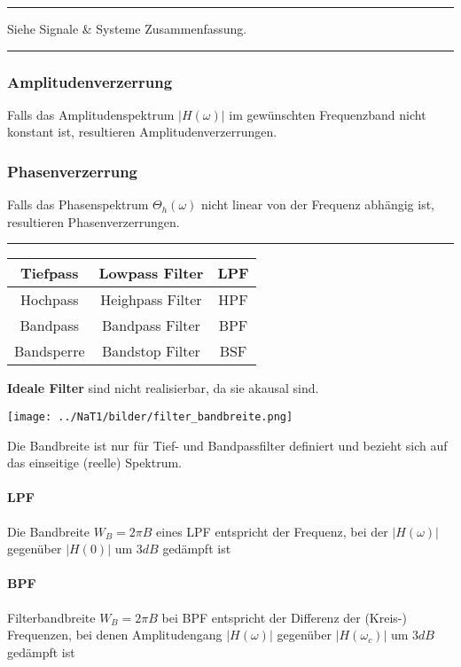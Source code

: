 \hrule
{}
Siehe Signale \& Systeme Zusammenfassung.\\

\hrule
{}
\subsubsection{Amplitudenverzerrung}
Falls das Amplitudenspektrum $|H(\omega)|$ im gewünschten Frequenzband nicht konstant ist,
resultieren Amplitudenverzerrungen.

\subsubsection{Phasenverzerrung}
Falls das Phasenspektrum $\Theta_h (\omega)$ nicht linear von der Frequenz abhängig ist, resultieren
Phasenverzerrungen.\\
\hrule


\begin{multicols}{2}
\begin{center}
\begin{tabular}{|c|c|c|}
\hline
Tiefpass & Lowpass Filter & LPF \\
\hline
Hochpass & Heighpass Filter & HPF \\
\hline
Bandpass & Bandpass Filter & BPF \\
\hline
Bandsperre & Bandstop Filter & BSF \\
\hline
\end{tabular}
\end{center}
\columnbreak

\textbf{Ideale Filter} sind nicht realisierbar, da sie akausal sind.
\end{multicols}

\begin{minipage}{7cm}
	\texttt{[image: ../NaT1/bilder/filter\_bandbreite.png]}
\end{minipage}
\begin{minipage}{11cm}
	Die Bandbreite ist nur für Tief- und Bandpassfilter definiert und bezieht sich auf das einseitige (reelle) Spektrum.
	\paragraph{LPF}	Die Bandbreite $W_B = 2 \pi B$ eines LPF entspricht der Frequenz, bei der $|H(\omega)|$ gegenüber $|H(0)|$ um $3 dB$ gedämpft ist
	\paragraph{BPF}	Filterbandbreite $W_B = 2 \pi B$ bei BPF entspricht der Differenz der (Kreis-) Frequenzen, bei denen Amplitudengang $|H(\omega)|$ gegenüber $|H(\omega_c)|$ um
	$3 dB$ gedämpft ist
\end{minipage}



